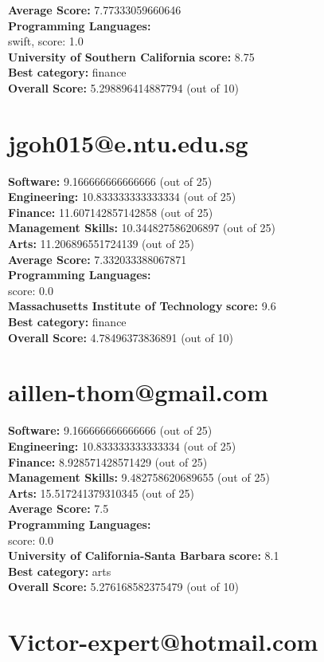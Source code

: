 \documentclass{article}
\begin{document}
\textbf{Average Score: } 7.77333059660646\\
\textbf{Programming Languages:} \\
swift, score: 1.0\\
\textbf{University of Southern California} \textbf{score:} 8.75\\
\textbf{Best category: } finance\\
\textbf{Overall Score: }5.298896414887794 (out of 10)\section{jgoh015@e.ntu.edu.sg}
\textbf{Software:} 9.166666666666666 (out of 25)\\
\textbf{Engineering: } 10.833333333333334 (out of 25)\\
\textbf{Finance:} 11.607142857142858 (out of 25)\\
\textbf{Management Skills:} 10.344827586206897 (out of 25)\\
\textbf{Arts:} 11.206896551724139 (out of 25)\\
\textbf{Average Score: } 7.332033388067871\\
\textbf{Programming Languages:} \\
score: 0.0\\
\textbf{Massachusetts Institute of Technology} \textbf{score:} 9.6\\
\textbf{Best category: } finance\\
\textbf{Overall Score: }4.78496373836891 (out of 10)\section{aillen-thom@gmail.com}
\textbf{Software:} 9.166666666666666 (out of 25)\\
\textbf{Engineering: } 10.833333333333334 (out of 25)\\
\textbf{Finance:} 8.928571428571429 (out of 25)\\
\textbf{Management Skills:} 9.482758620689655 (out of 25)\\
\textbf{Arts:} 15.517241379310345 (out of 25)\\
\textbf{Average Score: } 7.5\\
\textbf{Programming Languages:} \\
score: 0.0\\
\textbf{University of California-Santa Barbara} \textbf{score:} 8.1\\
\textbf{Best category: } arts\\
\textbf{Overall Score: }5.276168582375479 (out of 10)\section{Victor-expert@hotmail.com}
\end{document}

